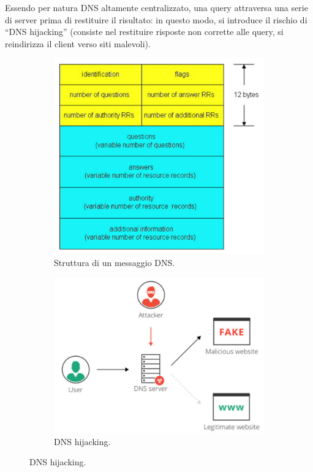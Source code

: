 \documentclass[11pt, italian, openany]{book}
\begin{document}
\begin{sloppypar}
\begin{itemize}[topsep=0pt]
	Essendo per natura DNS altamente centralizzato, una query attraversa una serie di server prima di restituire il risultato: in questo modo, si introduce il
	rischio di ``DNS hijacking'' (consiste nel restituire risposte non corrette alle query, si reindirizza il client verso siti malevoli).

	\begin{figure}[!h]
		\begin{subfigure}{0.49 \linewidth} \centering
			\includegraphics[scale=0.265]{images/dns-messaggio.png}
			\caption{Struttura di un messaggio DNS.}
		\end{subfigure}
		\begin{subfigure}{0.49 \linewidth} \centering
			\includegraphics[scale=0.35]{images/dns-hijacking.png}
			\caption{DNS hijacking.}
		\end{subfigure}
	\end{figure}



\end{itemize}
\end{sloppypar}
\end{document}
